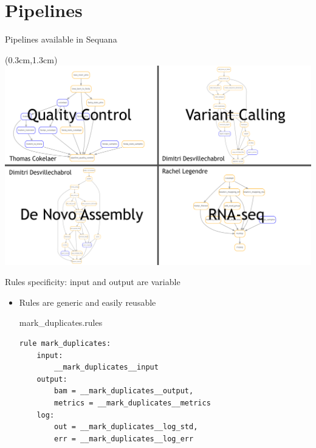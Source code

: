 \documentclass{beamer}
\begin{document}
\section{Pipelines}

\begin{frame}{Pipelines available in Sequana}
    \begin{textblock*}{5cm}(0.3cm,1.3cm)
        \includegraphics[scale=0.215]{images/pipelines}
    \end{textblock*}
\end{frame}

\begin{frame}[fragile]{Rules specificity: input and output are variable}
    \begin{itemize}
        \item Rules are generic and easily reusable
        \begin{block}{mark\_duplicates.rules}
        \begin{lstlisting}
rule mark_duplicates:
    input:
        __mark_duplicates__input
    output:
        bam = __mark_duplicates__output,
        metrics = __mark_duplicates__metrics
    log:
        out = __mark_duplicates__log_std,
        err = __mark_duplicates__log_err
        \end{lstlisting}
        \end{block}
    \end{itemize}
\end{frame}
\end{document}
